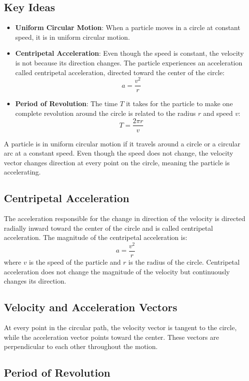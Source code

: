 \documentclass{article}
\begin{document}
\subsection*{Key Ideas}
\begin{itemize}
    \item \textbf{Uniform Circular Motion}: When a particle moves in a circle at constant speed, it is in uniform circular motion.
    \item \textbf{Centripetal Acceleration}: Even though the speed is constant, the velocity is not because its direction changes. The particle experiences an acceleration called centripetal acceleration, directed toward the center of the circle:
    \[
    a = \frac{v^2}{r}
    \]
    \item \textbf{Period of Revolution}: The time $T$ it takes for the particle to make one complete revolution around the circle is related to the radius $r$ and speed $v$:
    \[
    T = \frac{2\pi r}{v}
    \]
\end{itemize}
A particle is in uniform circular motion if it travels around a circle or a circular arc at a constant speed. Even though the speed does not change, the velocity vector changes direction at every point on the circle, meaning the particle is accelerating.

\subsection*{Centripetal Acceleration}

The acceleration responsible for the change in direction of the velocity is directed radially inward toward the center of the circle and is called centripetal acceleration. The magnitude of the centripetal acceleration is:
\[
a = \frac{v^2}{r}
\]
where $v$ is the speed of the particle and $r$ is the radius of the circle. Centripetal acceleration does not change the magnitude of the velocity but continuously changes its direction.

\subsection*{Velocity and Acceleration Vectors}

At every point in the circular path, the velocity vector is tangent to the circle, while the acceleration vector points toward the center. These vectors are perpendicular to each other throughout the motion.

\subsection*{Period of Revolution}
\end{document}
